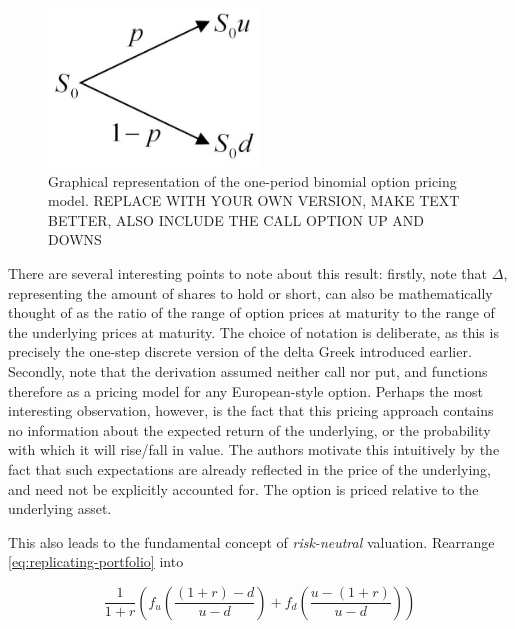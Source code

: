 \documentclass[english,12pt,a4paper,pdftex,sci,utf8]{aaltothesis}
\begin{document}
\begin{figure}[h]
    \centering
    \includegraphics[width=0.5\textwidth]{oneperiodbinom.jpg}
    \caption{Graphical representation of the one-period binomial option pricing model. REPLACE WITH YOUR OWN VERSION, MAKE TEXT BETTER, ALSO INCLUDE THE CALL OPTION UP AND DOWNS}
    \label{fig:oneperiodbinom}
\end{figure}



There are several interesting points to note about this result: firstly, note that $\Delta$, representing the amount of shares to hold or short, can also be mathematically thought of as the ratio of the range of option prices at maturity to the range of the underlying prices at maturity. The choice of notation is deliberate, as this is precisely the one-step discrete version of the delta Greek introduced earlier. Secondly, note that the derivation assumed neither call nor put, and functions therefore as a pricing model for any European-style option. Perhaps the most interesting observation, however, is the fact that this pricing approach contains no information about the expected return of the underlying, or the probability with which it will rise/fall in value. The authors motivate this intuitively by the fact that such expectations are already reflected in the price of the underlying, and need not be explicitly accounted for. The option is priced relative to the underlying asset.

This also leads to the fundamental concept of \emph{risk-neutral} valuation. Rearrange \ref{eq:replicating-portfolio} into

\begin{equation}
     \frac{1}{1+r}\left(f_u(\frac{(1+r)-d}{u-d})+f_d(\frac{u-(1+r)}{u-d})\right)
\end{equation}
\end{document}
